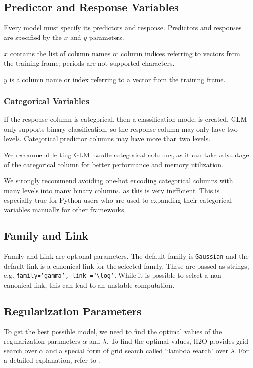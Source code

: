 \subsection{Predictor and Response Variables}

Every model must specify its predictors and response.  Predictors and responses are specified by the $x$
and $y$ parameters.

$x$ contains the list of column names or column indices referring to vectors from the training frame; periods are not supported characters.

$y$ is a column name or index referring to a vector from the training frame.

\subsubsection{Categorical Variables}

If the response column is categorical, then a classification model is created.  GLM only supports binary
classification, so the response column may only have two levels. Categorical predictor columns may have more than two levels.

We recommend letting GLM handle categorical columns, as it can take advantage of the categorical
column for better performance and memory utilization.

We strongly recommend avoiding one-hot encoding categorical columns with many levels into many binary columns, as this is very inefficient.  This is especially true for Python users who are used to expanding their categorical variables manually for other frameworks.

\subsection{Family and Link}

Family and Link are optional parameters. The default family is \texttt{Gaussian} and the default link is a
canonical link for the selected family. These are passed as strings, e.g. \texttt{family=`gamma', link =`$\log$'}.
While it is possible to select  a non-canonical link, this can lead to an unstable computation. 

\subsection{Regularization Parameters}

To get the best possible model, we need to find the optimal values of the regularization parameters $\alpha$ and
$\lambda$.  To find the optimal values, H2O provides grid search over $\alpha$ and a special form of grid search
called ``lambda search" over $\lambda$. For a detailed explanation, refer to .


